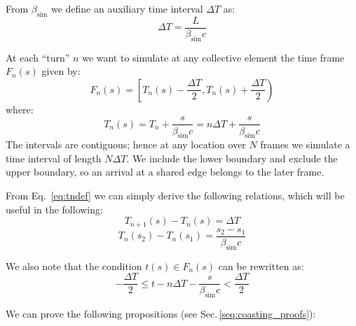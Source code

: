 From $\beta_\text{sim}$ we define an auxiliary time interval $\Delta T$ as:
\begin{equation}
\Delta T = \frac{L}{\beta_\text{sim}c}
\label{eq:deltatdef}
\end{equation}


At each ``turn'' $n$ we want to simulate at any  collective element the time frame $F_n(s) $ given by:
\begin{equation}
F_n(s) = \left[ T_n(s) - \frac{\Delta T}{2}, T_n(s) + \frac{\Delta T}{2} \right)
\label{eq:framedef}
\end{equation}
where:
\begin{equation}
T_n(s) = T_n + \frac{s}{\beta_\text{sim} c}
       = n \Delta T + \frac{s}{\beta_\text{sim} c}
\label{eq:tndef}
\end{equation}
The intervals are contiguous; hence at any location over $N$ frames we simulate a time interval of length $N \Delta T$. We include the lower boundary and exclude the upper boundary, so an arrival at a shared edge belongs to the later frame.

From Eq.~\ref{eq:tndef} we can simply derive the following relations, which will be useful in the following:
\begin{equation}
T_{n+1}(s) - T_{n}(s)  = \Delta T
\label{eq:tniter}
\end{equation}
\begin{equation}
T_{n}(s_2) - T_{n}(s_1)  = \frac{s_2 - s_1}{\beta_\text{sim} c}
\label{eq:frametransport}
\end{equation}

We also note that the condition $t(s) \in F_n(s)$ can be rewritten as:
\begin{equation}
- \frac{\Delta T}{2} \leq t - n \Delta T - \frac{s}{\beta_\text{sim} c} < \frac{\Delta T}{2}
\label{eq:frameineq}
\end{equation}


We can prove the following propositions (see Sec.\,\ref{seq:coasting_proofs}):

